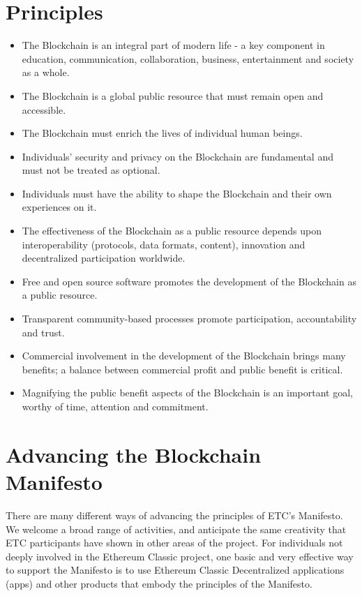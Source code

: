 \documentclass[twoside,twocolumn]{article}
\begin{document}
\section{Principles}
\begin{itemize}
  \item The Blockchain is an integral part of modern life - a key component in
  education, communication, collaboration, business, entertainment and society
  as a whole.
  \item The Blockchain is a global public resource that must remain open and
  accessible.
  \item The Blockchain must enrich the lives of individual human beings.
  \item Individuals’ security and privacy on the Blockchain are fundamental and
must not be treated as optional.
  \item Individuals must have the ability to shape the Blockchain and their own
experiences on it.
  \item The effectiveness of the Blockchain as a public resource depends upon
interoperability (protocols, data formats, content), innovation and
decentralized participation worldwide.
  \item Free and open source software promotes the development of the Blockchain
as a public resource.
  \item Transparent community-based processes promote participation,
  accountability and trust.
  \item Commercial involvement in the development of the Blockchain brings many
 benefits; a balance between commercial profit and public benefit is critical.
  \item Magnifying the public benefit aspects of the Blockchain is an important
   goal, worthy of time, attention and commitment.
\end{itemize}

\section{Advancing the Blockchain Manifesto}
There are many different ways of advancing the principles of ETC's
Manifesto. We welcome a broad range of activities, and anticipate the same
creativity that ETC participants have shown in other areas of the project.
For individuals not deeply involved in the Ethereum Classic project,
one basic and very effective way to support the Manifesto is to use
Ethereum Classic Decentralized applications ({\DH}apps) and other products that embody the
principles of the Manifesto.
\end{document}
